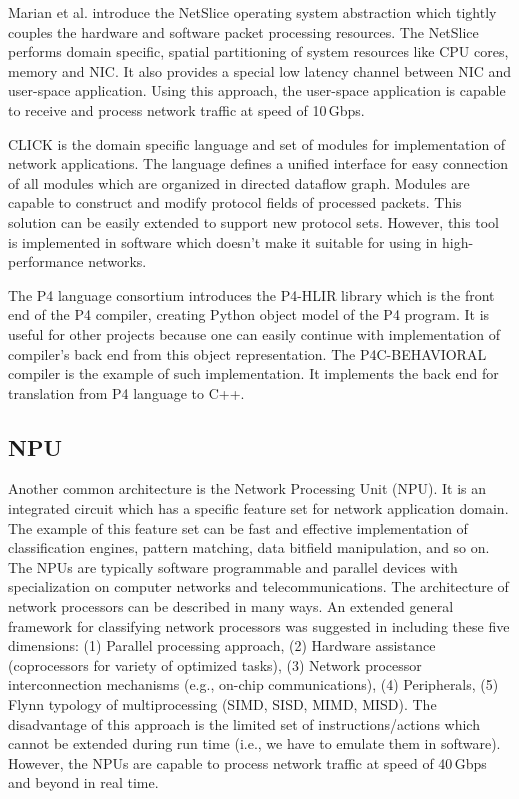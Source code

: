 Marian et al. \cite{MarianNetSlicesUserDefinedProcess} introduce the NetSlice operating system abstraction which 
tightly couples the hardware and software packet processing resources. 
The NetSlice performs domain specific, spatial partitioning of system resources like CPU cores, memory and NIC. 
It also provides a special low latency channel between NIC and user-space application. 
Using this approach, the user-space application is capable to receive and process network traffic at speed of 10\,Gbps.

CLICK \cite{kohler2000click} is the domain specific language and set of modules for implementation
of network applications. The language defines a unified interface for easy connection of all modules
which are organized in directed dataflow graph. Modules are capable to construct and modify protocol fields
of processed packets. This solution can be easily extended to support new protocol sets. However, this tool is implemented
in software which doesn't make it suitable for using in high-performance networks. 

The P4 language consortium introduces the P4-HLIR library \cite{p4hlir} which is the front end of the P4 compiler, creating Python object model of the 
P4 program. It is useful for other projects because one can easily continue with implementation of compiler's back end from this object
representation. The P4C-BEHAVIORAL compiler \cite{p4cbeavioral} is the example of such implementation. It implements the back end for translation
from P4 language to C++.

\subsection*{NPU}
Another common architecture is the Network Processing Unit (NPU). It is an integrated circuit which has a specific feature set for network 
application domain. The example of this feature set can be fast and effective implementation of classification engines, pattern matching, 
data bitfield manipulation, and so on. 
The NPUs are typically software programmable and parallel devices with specialization on computer networks and telecommunications. 
The architecture of network processors can be described in many ways. An extended general framework for classifying network processors was suggested in 
\cite{giladi2008network} including these five dimensions: 
(1) Parallel processing approach, (2) Hardware assistance (coprocessors for variety of optimized tasks), 
(3) Network processor interconnection mechanisms (e.g., on-chip communications), (4) Peripherals, 
(5) Flynn typology of multiprocessing (SIMD, SISD, MIMD, MISD). 
The disadvantage of this approach is the limited set of instructions/actions which cannot be extended during 
run time (i.e., we have to emulate them in software). 
However, the NPUs are capable to process network traffic at speed of 40\,Gbps \cite{netronome-npu} and beyond in real time. 

